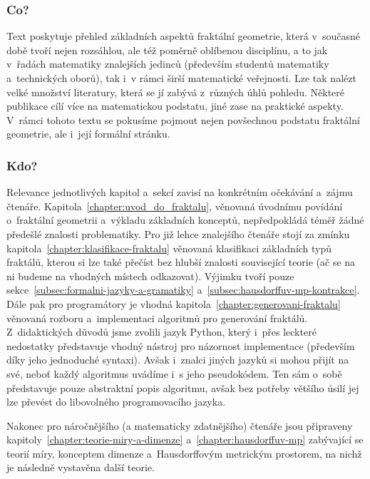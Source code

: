 \label{chapter:predmluva}

\subsubsection{Co?}

Text poskytuje přehled základních aspektů fraktální geometrie, která v~současné době tvoří nejen rozsáhlou, ale též poměrně oblíbenou disciplínu, a to jak v~řadách matematiky znalejších jedinců (především studentů matematiky a~technických oborů), tak i~v rámci širší matematické veřejnosti. Lze tak nalézt velké množství literatury, která se jí zabývá z~různých úhlů pohledu. Některé publikace cílí více na matematickou podstatu, jiné zase na praktické aspekty. V~rámci tohoto textu se pokusíme pojmout nejen povšechnou podstatu fraktální geometrie, ale i~její formální stránku.

\subsubsection{Kdo?}

Relevance jednotlivých kapitol a~sekcí zavisí na konkrétním očekávání a~zájmu čtenáře. Kapitola~\ref{chapter:uvod_do_fraktalu}, věnovaná úvodnímu povídání o~fraktální geometrii a~výkladu základních konceptů, nepředpokládá téměř žádné předešlé znalosti problematiky. Pro již lehce znalejšího čtenáře stojí za zmínku kapitola~\ref{chapter:klasifikace-fraktalu} věnovaná klasifikaci základních typů fraktálů, kterou si lze také přečíst bez hlubší znalosti související teorie (ač se na ni budeme na vhodných místech odkazovat). Výjimku tvoří pouze sekce~\ref{subsec:formalni-jazyky-a-gramatiky} a~\ref{subsec:hausdorffuv-mp-kontrakce}. Dále pak pro programátory je vhodná kapitola~\ref{chapter:generovani-fraktalu} věnovaná rozboru a~implementaci algoritmů pro generování fraktálů. Z~didaktických důvodů jsme zvolili jazyk Python, který i~přes leckteré nedostatky představuje vhodný nástroj pro názornost implementace (především díky jeho jednoduché syntaxi). Avšak i~znalci jiných jazyků si mohou přijít na své, neboť každý algoritmus uvádíme i~s jeho pseudokódem. Ten sám o~sobě představuje pouze abstraktní popis algoritmu, avšak bez potřeby většího úsilí jej lze převést do libovolného programovacího jazyka.

Nakonec pro náročnějšího (a matematicky zdatnějšího) čtenáře jsou připraveny kapitoly~\ref{chapter:teorie-miry-a-dimenze} a~\ref{chapter:hausdorffuv-mp} zabývající se teorií míry, konceptem dimenze a~Hausdorffovým metrickým prostorem, na nichž je následně vystavěna další teorie.

